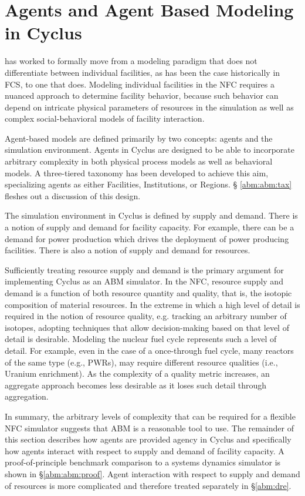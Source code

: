 
\section{Agents and Agent Based Modeling in Cyclus}\label{abm:abm}

\Cyclus has worked to formally move from a modeling paradigm that does not
differentiate between individual facilities, as has been the case historically
in FCS, to one that does. Modeling individual facilities in the NFC requires a
nuanced approach to determine facility behavior, because such behavior can
depend on intricate physical parameters of resources in the simulation as well
as complex social-behavioral models of facility interaction.

Agent-based models are defined primarily by two concepts: agents and the
simulation environment. Agents in Cyclus are designed to be able to incorporate
arbitrary complexity in both physical process models as well as behavioral
models. A three-tiered taxonomy has been developed to achieve this aim,
specializing agents as either Facilities, Institutions, or Regions. \S
\ref{abm:abm:tax} fleshes out a discussion of this design.

The simulation environment in Cyclus is defined by supply and demand. There is a
notion of supply and demand for facility capacity. For example, there can be a
demand for power production which drives the deployment of power producing
facilities. There is also a notion of supply and demand for resources. 

Sufficiently treating resource supply and demand is the primary argument for
implementing Cyclus as an ABM simulator. In the NFC, resource supply and demand
is a function of both resource quantity and quality, that is, the isotopic
composition of material resources. In the extreme in which a high level of
detail is required in the notion of resource quality, e.g. tracking an arbitrary
number of isotopes, adopting techniques that allow decision-making based on that
level of detail is desirable. Modeling the nuclear fuel cycle represents such a
level of detail. For example, even in the case of a once-through fuel cycle,
many reactors of the same type (e.g., PWRs), may require different resource
qualities (i.e., Uranium enrichment). As the complexity of a quality metric
increases, an aggregate approach becomes less desirable as it loses such detail
through aggregation.

In summary, the arbitrary levels of complexity that can be required for a
flexible NFC simulator suggests that ABM is a reasonable tool to use. The
remainder of this section describes how agents are provided agency in Cyclus and
specifically how agents interact with respect to supply and demand of facility
capacity. A proof-of-principle benchmark comparison to a systems dynamics
simulator is shown in \S \ref{abm:abm:proof}. Agent interaction with respect to
supply and demand of resources is more complicated and therefore treated
separately in \S \ref{abm:dre}.

